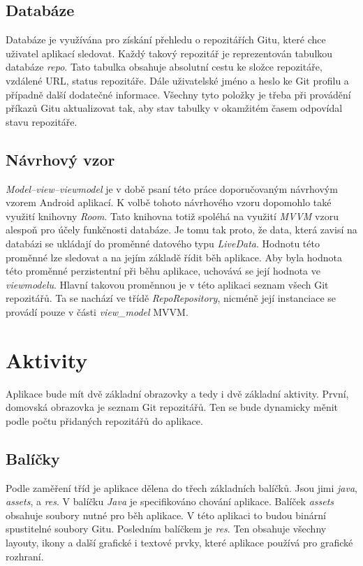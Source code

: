         \subsection{Databáze}
        Databáze je využívána pro získání přehledu o repozitářích Gitu, které chce uživatel aplikací sledovat. Každý takový repozitář je reprezentován tabulkou databáze \emph{repo}. Tato tabulka obsahuje absolutní cestu ke složce repozitáře, vzdálené URL, status repozitáře. Dále uživatelské jméno a heslo ke Git profilu a případně další dodatečné informace. Všechny tyto položky je třeba při provádění příkazů Gitu aktualizovat tak, aby stav tabulky v okamžitém časem odpovídal stavu repozitáře.

        \subsection{Návrhový vzor}
        \emph{Model–view–viewmodel} je v době psaní této práce doporučovaným návrhovým vzorem Android aplikací. K volbě tohoto návrhového vzoru dopomohlo také využití knihovny \emph{Room}. Tato knihovna totiž spoléhá na využití \emph{MVVM} vzoru alespoň pro účely funkčnosti databáze. Je tomu tak proto, že data, která zavisí na databázi se ukládají do proměnné datového typu \emph{LiveData}. Hodnotu této proměnné lze sledovat a na jejím základě řídit běh aplikace. Aby byla hodnota této proměnné perzistentní při běhu aplikace, uchovává se její hodnota ve \emph{viewmodelu}. Hlavní takovou proměnnou je v této aplikaci seznam všech Git repozitářů. Ta se nachází ve třídě \emph{RepoRepository}, nicméně její instanciace se provádí pouze v části \emph{view\_model} MVVM.

    \section{Aktivity}
    Aplikace bude mít dvě základní obrazovky a tedy i dvě základní aktivity. První, domovská obrazovka je seznam Git repozitářů. Ten se bude dynamicky měnit podle počtu přidaných repozitářů do aplikace.

    \subsection{Balíčky}
    Podle zaměření tříd je aplikace dělena do třech základních balíčků. Jsou jimi \emph{java}, \emph{assets}, a \emph{res}. V balíčku \emph{Java} je specifikováno chování aplikace. Balíček \emph{assets} obsahuje soubory nutné pro běh aplikace. V této aplikaci to budou binární spustitelné soubory Gitu. Posledním balíčkem je \emph{res}. Ten obsahuje všechny layouty, ikony a další grafické i textové prvky, které aplikace používá pro grafické rozhraní.

